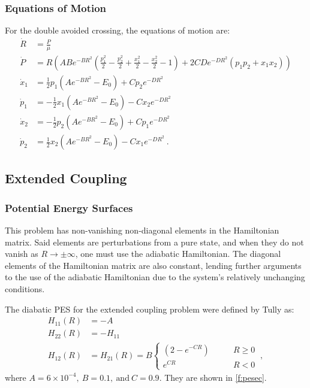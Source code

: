 \subsubsection{Equations of Motion}
%
For the double avoided crossing, the equations of motion are:
\begin{subequations}
\begin{align}
\dot{R} & = \frac{P}{\mu }\\
\dot{P} & = R \left(A B e^{-B R^2} \left(\frac{p_1^2}{2}-\frac{p_2^2}{2}+\frac{x_1^2}{2}-\frac{x_2^2}{2}-1\right)+2 C D e^{-D R^2} (p_1 p_2+ x_1 x_2)\right)\\
\dot{x}_{1} & = \frac{1}{2} p_1 \left(A e^{-B R^2}-E_0\right)+C p_2 e^{-D R^2}\\
\dot{p}_{1} & = -\frac{1}{2} x_1 \left(A e^{-B R^2}-E_0\right)-C x_2 e^{-D R^2}\\
\dot{x}_{2} & = -\frac{1}{2} p_2 \left(A e^{-B R^2}-E_0\right) + C p_1 e^{-D R^2}\\
\dot{p}_{2} & = \frac{1}{2} x_2 \left(A e^{-B R^2}-E_0\right)-C x_1 e^{-D R^2}~.
\end{align}
\end{subequations}
%
\subsection{Extended Coupling}\label{s:ec}
%
\subsubsection{Potential Energy Surfaces}
%
This problem has non-vanishing non-diagonal elements in the Hamiltonian matrix. Said elements are perturbations from a pure state, and when they do not vanish as $ R \rightarrow \pm\infty $, one must use the adiabatic Hamiltonian. The diagonal elements of the Hamiltonian matrix are also constant, lending further arguments to the use of the adiabatic Hamiltonian due to the system's relatively unchanging conditions.

The diabatic PES for the extended coupling problem were defined by Tully \cite{tully} as:
\begin{subequations}
\begin{align}
H_{11}(R) & = -A\\
H_{22}(R) & = -H_{11}\\
H_{12}(R) & = H_{21}(R) = 
B\begin{cases}
\left(2 - e^{-C R}\right) &\qquad R \geq 0 \\
e^{C R} &\qquad R<0
\end{cases}~,
\end{align}
\end{subequations}
where $ A = 6 \times 10^{-4},~B = 0.1,~\text{and}~C = 0.9$. They are shown in \cref{f:pesec}.

